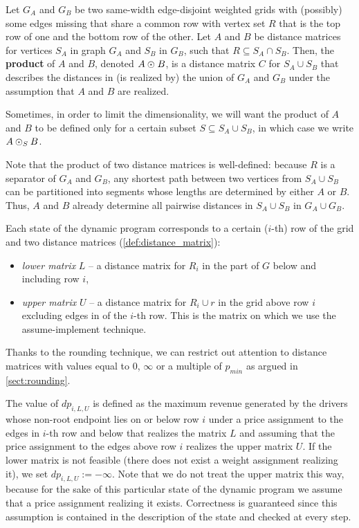 \begin{definition}
\label{def:dist_product}
Let $G_A$ and $G_B$ be two same-width edge-disjoint weighted grids with (possibly) some edges missing that share a common row with vertex set $R$ that is the top row of one and the bottom row of the other.
Let $A$ and $B$ be distance matrices for vertices $S_A$ in graph $G_A$ and $S_B$ in $G_B$, such that $R \subseteq S_A \cap S_B$.
Then, the \textbf{product} of $A$ and $B$, denoted $A \odot_{} B$, is a distance matrix $C$ for $S_A \cup S_B$ that
describes the distances in (is realized by) the union of $G_A$ and $G_B$
under the assumption that $A$ and $B$ are realized.

Sometimes, in order to limit the dimensionality, we will want the product of $A$ and $B$
to be defined only for a certain subset $S \subseteq S_A \cup S_B$, in which case we write $A \odot_{S} B$.
\end{definition}

Note that the product of two distance matrices is well-defined:
because $R$ is a separator of $G_A$ and $G_B$, any shortest path between two vertices from $S_A \cup S_B$ can be partitioned into segments whose lengths are determined by either $A$ or $B$.
Thus, $A$ and $B$ already determine all pairwise distances in $S_A \cup S_B$ in $G_A \cup G_B$.

Each state of the dynamic program corresponds to a certain ($i$-th) row of the grid
and two distance matrices (\cref{def:distance_matrix}):
\begin{itemize}[nosep]
\item \emph{lower matrix} $L$ --
a distance matrix for $R_i$ in the part of $G$ below and including row $i$,
\item \emph{upper matrix} $U$ --
a distance matrix for $R_i \cup {r}$ in the grid above row $i$ excluding edges in of the $i$-th row.
This is the matrix on which we use the assume-implement technique.
\end{itemize}
Thanks to the rounding technique, we can restrict out attention to distance matrices
with values equal to $0$, $\infty$ or a multiple of $p_{min}$ as argued in \cref{sect:rounding}.

The value of $dp_{i, L, U}$ is defined as the maximum revenue generated by the drivers
whose non-root endpoint lies on or below row $i$ under a price assignment
to the edges in $i$-th row and below that realizes the matrix $L$ and assuming that
the price assignment to the edges above row $i$ realizes the upper matrix $U$.
If the lower matrix is not feasible (there does not exist a weight assignment realizing it),
we set $dp_{i, L, U} := -\infty$.
Note that we do not treat the upper matrix this way, because
for the sake of this particular state of the dynamic program we assume that a price assignment realizing it exists.
Correctness is guaranteed since this assumption is contained in the description of the state and checked at every step.

